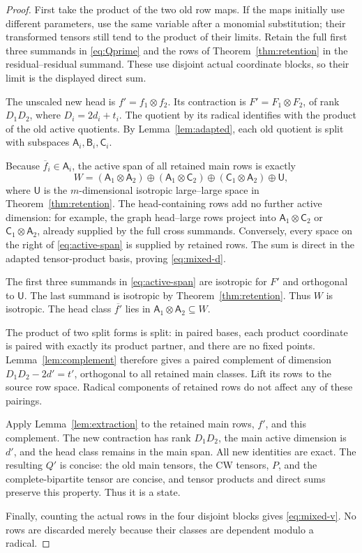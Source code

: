 \documentclass[11pt]{article}
\theoremstyle{definition}\newtheorem{definition}[theorem]{Definition}
\theoremstyle{remark}\newtheorem{remark}[theorem]{Remark}
\newcommand{\B}{\mathsf B}
\newcommand{\A}{\mathsf A}
\newcommand{\U}{\mathsf U}
\begin{document}
\begin{proof}
First take the product of the two old row maps. If the maps initially use different parameters, use the same variable after a monomial substitution; their transformed tensors still tend to the product of their limits. Retain the full first three summands in \eqref{eq:Qprime} and the rows of Theorem~\ref{thm:retention} in the residual--residual summand. These use disjoint actual coordinate blocks, so their limit is the displayed direct sum.

The unscaled new head is $f'=f_1\otimes f_2$. Its contraction is $F'=F_1\otimes F_2$, of rank $D_1D_2$, where $D_i=2d_i+t_i$. The quotient by its radical identifies with the product of the old active quotients. By Lemma~\ref{lem:adapted}, each old quotient is split with subspaces $\A_i,\B_i,\mathsf C_i$.

Because $\overline f_i\in\A_i$, the active span of all retained main rows is exactly
\begin{equation}\label{eq:active-span}
 W=(\A_1\otimes\A_2)\oplus(\A_1\otimes\mathsf C_2)
 \oplus(\mathsf C_1\otimes\A_2)\oplus\U,
\end{equation}
where $\U$ is the $m$-dimensional isotropic large--large space in Theorem~\ref{thm:retention}. The head-containing rows add no further active dimension: for example, the graph head--large rows project into $\A_1\otimes\mathsf C_2$ or $\mathsf C_1\otimes\A_2$, already supplied by the full cross summands. Conversely, every space on the right of \eqref{eq:active-span} is supplied by retained rows. The sum is direct in the adapted tensor-product basis, proving \eqref{eq:mixed-d}.

The first three summands in \eqref{eq:active-span} are isotropic for $F'$ and orthogonal to $\U$. The last summand is isotropic by Theorem~\ref{thm:retention}. Thus $W$ is isotropic. The head class $\overline{f'}$ lies in $\A_1\otimes\A_2\subseteq W$.

The product of two split forms is split: in paired bases, each product coordinate is paired with exactly its product partner, and there are no fixed points. Lemma~\ref{lem:complement} therefore gives a paired complement of dimension $D_1D_2-2d'=t'$, orthogonal to all retained main classes. Lift its rows to the source row space. Radical components of retained rows do not affect any of these pairings.

Apply Lemma~\ref{lem:extraction} to the retained main rows, $f'$, and this complement. The new contraction has rank $D_1D_2$, the main active dimension is $d'$, and the head class remains in the main span. All new identities are exact. The resulting $Q'$ is concise: the old main tensors, the CW tensors, $P$, and the complete-bipartite tensor are concise, and tensor products and direct sums preserve this property. Thus it is a state.

Finally, counting the actual rows in the four disjoint blocks gives \eqref{eq:mixed-v}. No rows are discarded merely because their classes are dependent modulo a radical.
\end{proof}
\end{document}
